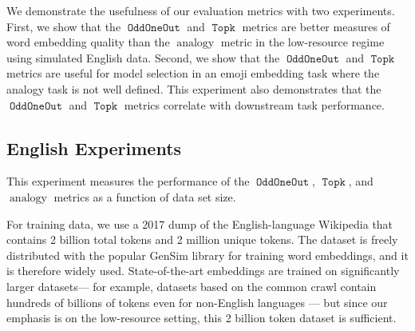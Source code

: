 \documentclass[11pt,a4paper]{article}
\DeclareMathOperator{\OddOneOut}{\texttt{OddOneOut}}
\DeclareMathOperator{\topk}{\texttt{Topk}}
\DeclareMathOperator{\analogy}{analogy}
\begin{document}
We demonstrate the usefulness of our evaluation metrics with two experiments.
First, we show that the $\OddOneOut$ and $\topk$ metrics are better measures of word embedding quality than the $\analogy$ metric in the low-resource regime using simulated English data.
Second, we show that the $\OddOneOut$ and $\topk$ metrics are useful for model selection in an emoji embedding task where the analogy task is not well defined.
This experiment also demonstrates that the $\OddOneOut$ and $\topk$ metrics correlate with downstream task performance.

\subsection{English Experiments}
\label{sec:experiments:eng}

This experiment measures the performance of the $\OddOneOut$, $\topk$, and $\analogy$ metrics as a function of data set size.


For training data, we use a 2017 dump of the English-language Wikipedia 
that contains 2 billion total tokens and 2 million unique tokens.
The dataset is freely distributed with the popular GenSim library \cite{rehurek_lrec} for training word embeddings,
and it is therefore widely used.
State-of-the-art embeddings are trained on significantly larger datasets---%
for example, datasets based on the common crawl contain hundreds of billions of tokens even for non-English languages \cite{buck2014n,grave2018learning}---%
but since our emphasis is on the low-resource setting,
this 2 billion token dataset is sufficient.
\end{document}
